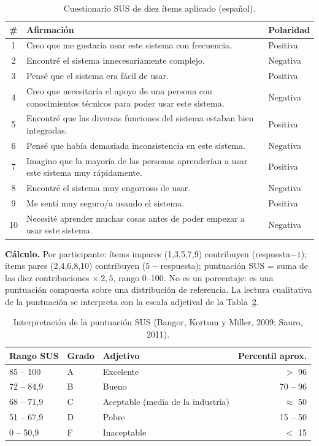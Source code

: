 \documentclass[11pt,a4paper]{article}
\begin{document}
\begin{table}[htbp]
\centering
\caption{Cuestionario SUS de diez ítems aplicado (español).}
\label{tab:sus-cuestionario}
\begin{tabular}{@{}cp{10.5cm}l@{}}
\toprule
\textbf{\#} & \textbf{Afirmación} & \textbf{Polaridad} \\
\midrule
1 & Creo que me gustaría usar este sistema con frecuencia. & Positiva \\
2 & Encontré el sistema innecesariamente complejo. & Negativa \\
3 & Pensé que el sistema era fácil de usar. & Positiva \\
4 & Creo que necesitaría el apoyo de una persona con conocimientos técnicos para poder usar este sistema. & Negativa \\
5 & Encontré que las diversas funciones del sistema estaban bien integradas. & Positiva \\
6 & Pensé que había demasiada inconsistencia en este sistema. & Negativa \\
7 & Imagino que la mayoría de las personas aprenderían a usar este sistema muy rápidamente. & Positiva \\
8 & Encontré el sistema muy engorroso de usar. & Negativa \\
9 & Me sentí muy seguro/a usando el sistema. & Positiva \\
10 & Necesité aprender muchas cosas antes de poder empezar a usar este sistema. & Negativa \\
\bottomrule
\end{tabular}
\end{table}

\textbf{Cálculo.} Por participante: ítems impares (1,3,5,7,9)
contribuyen (respuesta$-1$); ítems pares (2,4,6,8,10) contribuyen
($5-$respuesta); puntuación SUS = suma de las diez contribuciones
$\times\ 2{,}5$, rango 0--100. No es un porcentaje: es una puntuación
compuesta sobre una distribución de referencia. La lectura cualitativa
de la puntuación se interpreta con la escala adjetival de la
Tabla~\ref{tab:sus-interpretacion}.

\begin{table}[htbp]
\centering
\caption{Interpretación de la puntuación SUS (Bangor, Kortum y Miller, 2009; Sauro, 2011).}
\label{tab:sus-interpretacion}
\begin{tabular}{@{}lllr@{}}
\toprule
\textbf{Rango SUS} & \textbf{Grado} & \textbf{Adjetivo} & \textbf{Percentil aprox.} \\
\midrule
85 -- 100 & A & Excelente & $>$ 96 \\
72 -- 84,9 & B & Bueno & 70 -- 96 \\
68 -- 71,9 & C & Aceptable (media de la industria) & $\approx$ 50 \\
51 -- 67,9 & D & Pobre & 15 -- 50 \\
0 -- 50,9 & F & Inaceptable & $<$ 15 \\
\bottomrule
\end{tabular}
\end{table}
\end{document}
